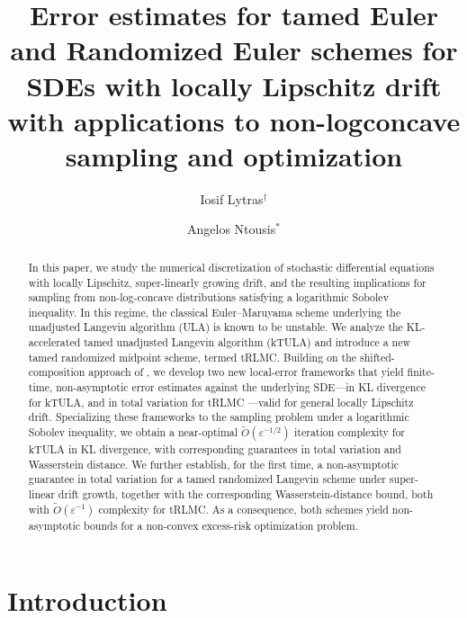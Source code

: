 \documentclass[11pt,a4paper,reqno]{amsart}
\title[]%
{Error estimates for tamed Euler and Randomized Euler schemes for SDEs with locally Lipschitz drift with applications to non-logconcave sampling and optimization}
\author[I.~Lytras]{Iosif Lytras$^{\dagger}$}
\author[A.~Ntousis]{Angelos Ntousis$^{\ast}$}
\theoremstyle{plain}
\theoremstyle{definition}
\theoremstyle{remark}
\begin{document}
\begin{abstract}
In this paper, we study the numerical discretization of stochastic differential equations with locally Lipschitz, super-linearly growing drift, and the resulting implications 
for sampling from non-log-concave distributions satisfying a logarithmic Sobolev inequality. 
In this regime, the classical Euler--Maruyama scheme underlying the unadjusted Langevin 
algorithm (ULA) is known to be unstable. We analyze the KL-accelerated tamed unadjusted 
Langevin algorithm (kTULA) and introduce a new tamed randomized midpoint scheme, termed 
tRLMC. Building on the shifted-composition approach of \cite{chewi2024local}, we develop 
two new local-error frameworks that yield finite-time, non-asymptotic error estimates 
against the underlying SDE---in KL divergence for kTULA, and in total variation for tRLMC 
---valid for general locally Lipschitz drift. Specializing these frameworks to the sampling 
problem under a logarithmic Sobolev inequality, we obtain a near-optimal 
$\widetilde{O}(\varepsilon^{-1/2})$ iteration complexity for kTULA in KL divergence, 
with corresponding guarantees in total variation and Wasserstein distance. We further 
establish, for the first time, a non-asymptotic guarantee in total variation for a tamed 
randomized Langevin scheme under super-linear drift growth, together with the corresponding 
Wasserstein-distance bound, both with $\widetilde{O}(\varepsilon^{-1})$ complexity for 
tRLMC. As a consequence, both schemes yield non-asymptotic  bounds for a
non-convex excess-risk optimization problem.
\end{abstract}
\maketitle






\section{Introduction}
\end{document}
